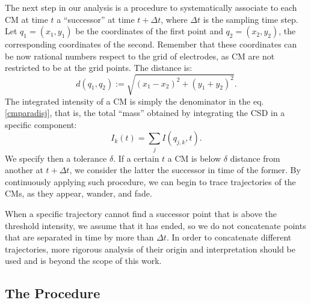 \documentclass[12pt]{article}
\begin{document}
The next step in our analysis is a procedure to systematically associate to each CM
at time $t$ a ``successor'' at time $t+\Delta t$, where $\Delta t$ is the sampling
time step. Let $q_1=(x_1, y_1)$ be the coordinates of the first point and $q_2=(x_2,y_2)$,
the corresponding coordinates of the second. Remember that these coordinates can be now
rational numbers
respect to the grid of electrodes, as CM are not restricted to be  at the grid points.
The distance is:
\begin{equation}
d(q_1,q_2):=\sqrt{(x_1-x_2)^2+(y_1+y_2)^2}.
\end{equation}
The integrated intensity of a CM is simply the denominator in the eq. \ref{cmparadisj},
that is, the total ``mass'' obtained by integrating the CSD in a specific component:
\begin{equation}
  I_k(t)=\sum_j I (q_{j,k}, t).
\end{equation}
We specify then a tolerance $\delta$. If a certain $t$ a CM is below $\delta$ distance from another at $t+\Delta t$, we consider the latter the successor in time of the former. By continuously applying such procedure, we can begin to trace trajectories of the CMs, as they appear, wander, and fade. 

When a specific trajectory cannot find a successor point that is above the
threshold intensity, we assume that it has ended, so we do not concatenate
points that are separated in time by more than $\Delta t$.
In order to concatenate different
trajectories, more rigorous analysis of their origin and interpretation
should be used and is
beyond the scope of this work.



 \subsection{The Procedure}
 
\end{document}
